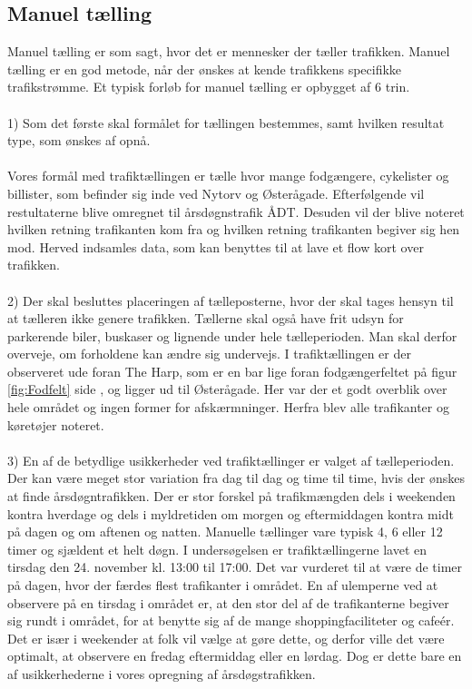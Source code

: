 \subsection{Manuel tælling}
\label{sub:manuel_taelling}
Manuel tælling er som sagt, hvor det er mennesker der tæller trafikken. Manuel tælling er en god metode, når der ønskes at kende trafikkens specifikke trafikstrømme. Et typisk forløb for manuel tælling er opbygget af 6 trin.
~\\\\
1) Som det første skal formålet for tællingen bestemmes, samt hvilken resultat type, som ønskes af opnå.
~\\\\
Vores formål med trafiktællingen er tælle hvor mange fodgængere, cykelister og billister, som befinder sig inde ved Nytorv og Østerågade. Efterfølgende vil restultaterne blive omregnet  til årsdøgnstrafik ÅDT. Desuden vil der blive noteret hvilken retning trafikanten kom fra og hvilken retning trafikanten begiver sig hen mod. Herved indsamles data, som kan benyttes til at lave et flow kort over trafikken.
~\\\\
2) Der skal besluttes placeringen af tælleposterne, hvor der skal tages hensyn til at tælleren ikke genere trafikken. Tællerne skal også have frit udsyn for parkerende biler, buskaser og lignende under hele tælleperioden. Man skal derfor overveje, om forholdene kan ændre sig undervejs. I trafiktællingen er der observeret ude foran The Harp, som er en bar lige foran fodgængerfeltet på figur \cref{fig:Fodfelt} side \pageref{fig:Fodfelt}, og ligger ud til Østerågade. Her var der et godt overblik over hele området og ingen former for afskærmninger. Herfra blev alle trafikanter og køretøjer noteret.
~\\\\
3) En af de betydlige usikkerheder ved trafiktællinger er valget af tælleperioden. Der kan være meget stor variation fra dag til dag og time til time, hvis der ønskes at finde årsdøgntrafikken. Der er stor forskel på trafikmængden dels i weekenden kontra hverdage og dels i myldretiden om morgen og eftermiddagen kontra midt på dagen og om aftenen og natten. Manuelle tællinger vare typisk 4, 6 eller 12 timer og sjældent et helt døgn. I undersøgelsen er trafiktællingerne lavet en tirsdag den 24. november kl. 13:00 til 17:00. Det var vurderet til at være de timer på dagen, hvor der færdes flest trafikanter i området. En af ulemperne ved at observere på en tirsdag i området er, at den stor del af de trafikanterne begiver sig rundt i området, for at benytte sig af de mange shoppingfaciliteter og cafeér. Det er især i weekender at folk vil vælge at gøre dette, og derfor ville det være optimalt, at observere en fredag eftermiddag eller en lørdag. Dog er dette bare en af usikkerhederne i vores opregning af årsdøgstrafikken.
